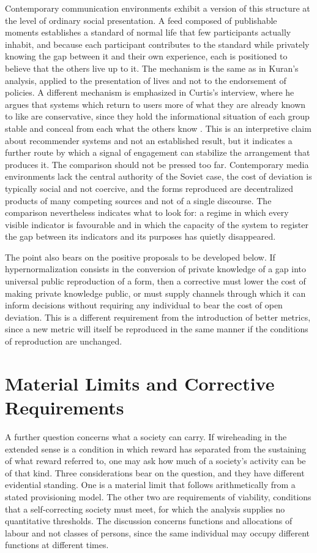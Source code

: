 \documentclass[11pt]{article}
\theoremstyle{definition}
\theoremstyle{remark}
\begin{document}
Contemporary communication environments exhibit a version of this structure at the level of ordinary social presentation. A feed composed of publishable moments establishes a standard of normal life that few participants actually inhabit, and because each participant contributes to the standard while privately knowing the gap between it and their own experience, each is positioned to believe that the others live up to it. The mechanism is the same as in Kuran's analysis, applied to the presentation of lives and not to the endorsement of policies. A different mechanism is emphasized in Curtis's interview, where he argues that systems which return to users more of what they are already known to like are conservative, since they hold the informational situation of each group stable and conceal from each what the others know \cite{brandcurtis2016}. This is an interpretive claim about recommender systems and not an established result, but it indicates a further route by which a signal of engagement can stabilize the arrangement that produces it. The comparison should not be pressed too far. Contemporary media environments lack the central authority of the Soviet case, the cost of deviation is typically social and not coercive, and the forms reproduced are decentralized products of many competing sources and not of a single discourse. The comparison nevertheless indicates what to look for: a regime in which every visible indicator is favourable and in which the capacity of the system to register the gap between its indicators and its purposes has quietly disappeared.

The point also bears on the positive proposals to be developed below. If hypernormalization consists in the conversion of private knowledge of a gap into universal public reproduction of a form, then a corrective must lower the cost of making private knowledge public, or must supply channels through which it can inform decisions without requiring any individual to bear the cost of open deviation. This is a different requirement from the introduction of better metrics, since a new metric will itself be reproduced in the same manner if the conditions of reproduction are unchanged.

\section{Material Limits and Corrective Requirements}

A further question concerns what a society can carry. If wireheading in the extended sense is a condition in which reward has separated from the sustaining of what reward referred to, one may ask how much of a society's activity can be of that kind. Three considerations bear on the question, and they have different evidential standing. One is a material limit that follows arithmetically from a stated provisioning model. The other two are requirements of viability, conditions that a self-correcting society must meet, for which the analysis supplies no quantitative thresholds. The discussion concerns functions and allocations of labour and not classes of persons, since the same individual may occupy different functions at different times.
\end{document}
